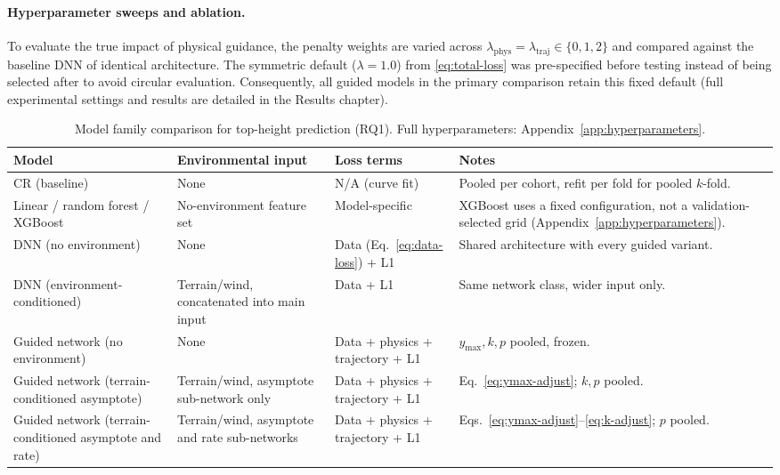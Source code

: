\paragraph*{Hyperparameter sweeps and ablation.}
\label{sec:rq1-ablation}
To evaluate the true impact of physical guidance, the penalty weights are varied across $\lambda_{\text{phys}} = \lambda_{\text{traj}} \in \{0, 1, 2\}$ and compared against the baseline DNN of identical architecture. The symmetric default ($\lambda = 1.0$) from \eqref{eq:total-loss} was pre-specified before testing instead of being selected after to avoid circular evaluation. Consequently, all guided models in the primary comparison retain this fixed default (full experimental settings and results are detailed in the Results chapter).

\begin{table}[!htbp]
\scriptsize
\renewcommand{\arraystretch}{1.2}
\begin{tabular}{p{3.2cm}p{3cm}p{2.6cm}p{4.5cm}}
\toprule
Model & Environmental input & Loss terms & Notes \\
\midrule
CR (baseline) & None & N/A (curve fit) & Pooled per cohort, refit per fold for pooled $k$-fold. \\
Linear / random forest / XGBoost & No-environment feature set & Model-specific & XGBoost uses a
fixed configuration, not a validation-selected grid (Appendix~\ref{app:hyperparameters}). \\
DNN (no environment) & None & Data (Eq.~\ref{eq:data-loss}) + L1 & Shared architecture with every
guided variant. \\
DNN (environment-conditioned) & Terrain/wind, concatenated into main input & Data + L1 & Same
network class, wider input only. \\
Guided network (no environment) & None & Data + physics + trajectory + L1 & $y_{\max},k,p$
pooled, frozen. \\
Guided network (terrain-conditioned asymptote) & Terrain/wind, asymptote sub-network only & Data +
physics + trajectory + L1 & Eq.~\ref{eq:ymax-adjust}; $k,p$ pooled. \\
Guided network (terrain-conditioned asymptote and rate) & Terrain/wind, asymptote and rate
sub-networks & Data + physics + trajectory + L1 & Eqs.~\ref{eq:ymax-adjust}--\ref{eq:k-adjust};
$p$ pooled. \\
\bottomrule
\end{tabular}
\caption{Model family comparison for top-height prediction (RQ1). Full hyperparameters:
Appendix~\ref{app:hyperparameters}.}
\label{tab:rq1-models}
\end{table}

